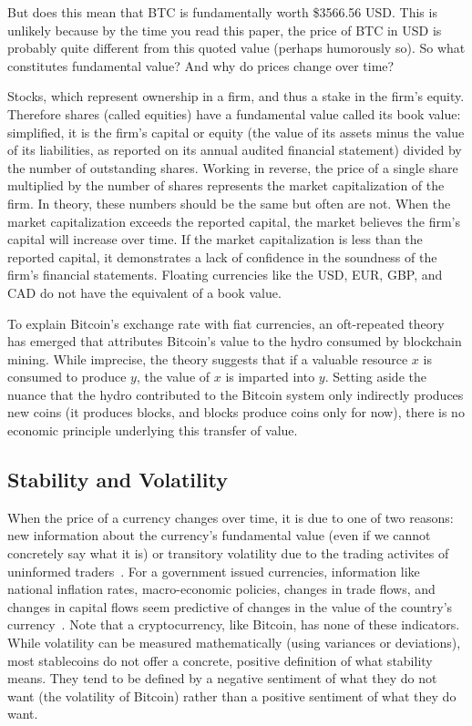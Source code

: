 But does this mean that BTC is fundamentally worth \$3566.56 USD. This is unlikely because by the time you read this paper, the price of BTC in USD is probably quite different from this quoted value (perhaps humorously so). So what constitutes fundamental value? And why do prices change over time?

Stocks, which represent ownership in a firm, and thus a stake in the firm's equity. Therefore shares (called equities) have a fundamental value called its book value: simplified, it is the firm's capital or equity (the value of its assets minus the value of its liabilities, as reported on its annual audited financial statement) divided by the number of outstanding shares. Working in reverse, the price of a single share multiplied by the number of shares represents the market capitalization of the firm. In theory, these numbers should be the same but often are not. When the market capitalization exceeds the reported capital, the market believes the firm's capital will increase over time. If the market capitalization is less than the reported capital, it demonstrates a lack of confidence in the soundness of the firm's financial statements. Floating currencies like the USD, EUR, GBP, and CAD do not have the equivalent of a book value.

To explain Bitcoin's exchange rate with fiat currencies, an oft-repeated theory has emerged that attributes Bitcoin's value to the hydro consumed by blockchain mining. While imprecise, the theory suggests that if a valuable resource $x$ is consumed to produce $y$, the value of $x$ is imparted into $y$. Setting aside the nuance that the hydro contributed to the Bitcoin system only indirectly produces new coins (it produces blocks, and blocks produce coins only for now), there is no economic principle underlying this transfer of value.



\subsection{Stability and Volatility}

When the price of a currency changes over time, it is due to one of two reasons: new information about the currency's fundamental value (even if we cannot concretely say what it is) or transitory volatility due to the trading activites of uninformed traders~\cite{harris2003trading}. For a government issued currencies, information like national inflation rates, macro-economic policies, changes in trade flows, and changes in capital flows seem predictive of changes in the value of the country's currency~\cite{harris2003trading}. Note that a cryptocurrency, like Bitcoin, has none of these indicators. While volatility can be measured mathematically (using variances or deviations), most stablecoins do not offer a concrete, positive definition of what stability means. They tend to be defined by a negative sentiment of what they do not want (the volatility of Bitcoin) rather than a positive sentiment of what they do want.

